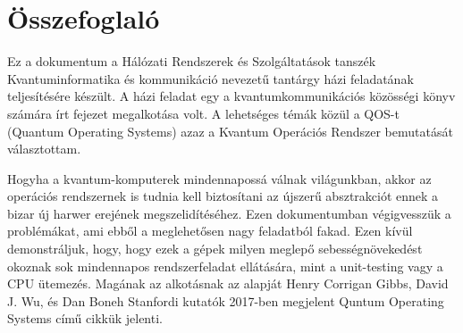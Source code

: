 \chapter*{Összefoglaló}

\hspace{2mm} Ez a dokumentum a Hálózati Rendszerek és Szolgáltatások tanszék Kvantuminformatika és kommunikáció nevezetű tantárgy házi feladatának teljesítésére készült.
A házi feladat egy a kvantumkommunikációs közösségi könyv számára írt fejezet megalkotása volt.
A lehetséges témák közül a QOS-t (Quantum Operating Systems) azaz a Kvantum Operációs Rendszer bemutatását választottam.

\indent Hogyha a kvantum-komputerek mindennapossá válnak világunkban, akkor az operációs rendszernek is tudnia kell biztosítani az újszerű absztrakciót ennek a bizar új harwer erejének megszelidítéséhez.
Ezen dokumentumban végigvesszük a problémákat, ami ebből a meglehetősen nagy feladatból fakad.
Ezen kívül demonstráljuk, hogy, hogy ezek a gépek milyen meglepő sebességnövekedést okoznak sok mindennapos rendszerfeladat ellátására, mint a unit-testing vagy a CPU ütemezés.
Magának az alkotásnak az alapját Henry Corrigan Gibbs, David J. Wu, és Dan Boneh Stanfordi kutatók 2017-ben megjelent Quntum Operating Systems című cikkük jelenti.
